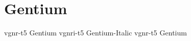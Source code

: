 \documentclass[sample]{vnsample}
\begin{document}
\section{Gentium}
  {vgnr-t5}  {Gentium}
 {vgnri-t5} {Gentium-Italic}
  {vgnr-t5}  {Gentium}
\end{document}
